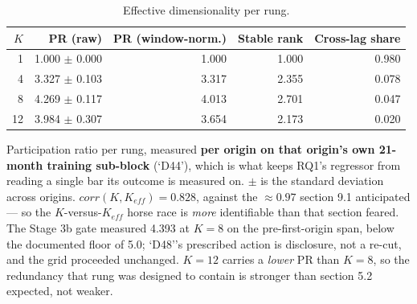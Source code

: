 \begin{table}[!t]
\centering
\caption{Effective dimensionality per rung.}
\label{tab:keff}
\begin{tabular}{rrrrr}
\toprule
$K$ & PR (raw) & PR (window-norm.) & Stable rank & Cross-lag share \\
\midrule
1 & 1.000 $\pm$ 0.000 & 1.000 & 1.000 & 0.980 \\
4 & 3.327 $\pm$ 0.103 & 3.317 & 2.355 & 0.078 \\
8 & 4.269 $\pm$ 0.117 & 4.013 & 2.701 & 0.047 \\
12 & 3.984 $\pm$ 0.307 & 3.654 & 2.173 & 0.020 \\
\bottomrule
\end{tabular}
\vspace{2pt}\par\footnotesize Participation ratio per rung, measured \textbf{per origin on that origin's own 21-month training sub-block} (`D44'), which is what keeps RQ1's regressor from reading a single bar its outcome is measured on. $\pm$ is the standard deviation across origins. $corr(K, K_{eff}) = 0.828$, against the $\approx 0.97$ section 9.1 anticipated --- so the $K$-versus-$K_{eff}$ horse race is \emph{more} identifiable than that section feared. The Stage 3b gate measured 4.393 at $K=8$ on the pre-first-origin span, below the documented floor of 5.0; `D48''s prescribed action is disclosure, not a re-cut, and the grid proceeded unchanged. $K=12$ carries a \emph{lower} PR than $K=8$, so the redundancy that rung was designed to contain is stronger than section 5.2 expected, not weaker.
\end{table}
